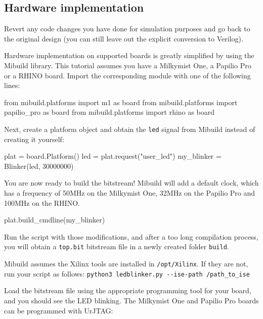 \documentclass[11pt]{paper}
\begin{document}

\subsection{Hardware implementation}
Revert any code changes you have done for simulation purposes and go back to the original design (you can still leave out the explicit conversion to Verilog).

Hardware implementation on supported boards is greatly simplified by using the Mibuild library. This tutorial assumes you have a Milkymist One, a Papilio Pro or a RHINO board. Import the corresponding module with one of the following lines:

\begin{verbatimtab}
from mibuild.platforms import m1 as board
from mibuild.platforms import papilio_pro as board
from mibuild.platforms import rhino as board
\end{verbatimtab}


Next, create a platform object and obtain the \verb!led! signal from Mibuild instead of creating it yourself:
\begin{verbatimtab}
plat = board.Platform()
led = plat.request("user_led")
my_blinker = Blinker(led, 30000000)
\end{verbatimtab}

You are now ready to build the bitstream! Mibuild will add a default clock, which has a frequency of 50MHz on the Milkymist One, 32MHz on the Papilio Pro and 100MHz on the RHINO.
\begin{verbatimtab}
plat.build_cmdline(my_blinker)
\end{verbatimtab}

Run the script with those modifications, and after a too long compilation process, you will obtain a \verb!top.bit! bitstream file in a newly created folder \verb!build!.

Mibuild assumes the Xilinx tools are installed in \verb!/opt/Xilinx!. If they are not, run your script as follows: \verb!python3 ledblinker.py --ise-path /path_to_ise!

Load the bitstream file using the appropriate programming tool for your board, and you should see the LED blinking. The Milkymist One and Papilio Pro boards can be programmed with UrJTAG:
\end{document}
